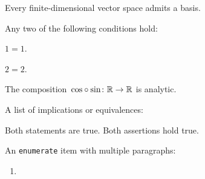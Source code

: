 \begin{equivlist}
  \item
    \label{every fd vs has a basis}
    Every finite-dimensional vector space admits a basis.
  \item
    \label{any two of the equalities}
    Any two of the following conditions hold:
    \begin{equivlist}
      \item
        $1 = 1$.
      \item
        $2 = 2$.
    \end{equivlist} 
  \item
    \label{composition is analytic}
    The composition~${\cos} \circ {\sin} \colon \mathbb{R} \to \mathbb{R}$ is analytic.
\end{equivlist}
A list of implications or equivalences:
\begin{implist}
    Both statements are true.
    Both assertions hold true.
\end{implist}
An \texttt{enumerate} item with multiple paragraphs:
\begin{enumerate}
  \item
    \lipsum[1-2]
\end{enumerate}
